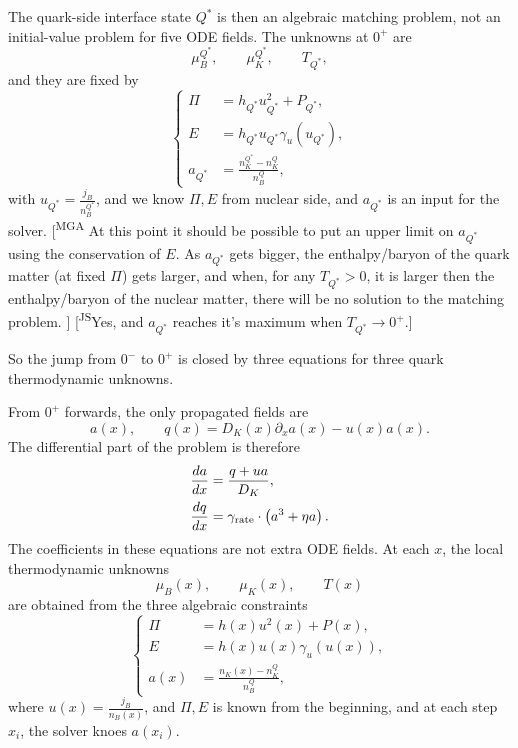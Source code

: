 \documentclass[11pt]{article}
\newcommand{\mgacom}[1]{\textsf{\color[rgb]{0.75,0,0}[\textsuperscript{MGA} #1]}}
\newcommand{\JScom}[1]{\textsf{\color{violet} [\textsuperscript{JS}#1]}}
\begin{document}
{The quark-side interface state \(Q^\ast\) is then an algebraic matching problem,
not an initial-value problem for five ODE fields.  The unknowns at \(0^+\) are
\begin{equation}
\mu_B^{Q^\ast},\qquad \mu_K^{Q^\ast},\qquad T_{Q^\ast},
\end{equation}
and they are fixed by
\begin{equation}
\left\{
\begin{aligned}
\Pi & = h_{Q^\ast}u_{Q^\ast}^2+P_{Q^\ast}, \\
E & = h_{Q^\ast}u_{Q^\ast}\gamma_u(u_{Q^\ast}),\\
a_{Q^\ast} & = \frac{n_K^{Q^\ast}-n_K^Q}{n_B^Q},
\end{aligned}
\right.
\end{equation}
with $u_{Q^\ast}=\frac{j_B}{n_B^{Q^\ast}}$, and we know $\Pi, E$ from nuclear side, and $a_{Q^\ast}$ is an input for the solver.
\mgacom{At this point it should be possible to put an upper limit on $a_{Q^*}$ using the conservation of $E$. As $a_{Q^*}$ gets bigger, the enthalpy/baryon of the quark matter (at fixed $\Pi$) gets larger, and when, for any $T_{Q^*}>0$, it is larger then the enthalpy/baryon of the nuclear matter, there will be no solution to the matching problem. }\JScom{Yes, and $a_{Q^*}$ reaches it's maximum when $T_{Q^*}\to 0^+$.}

So the jump from \(0^-\) to \(0^+\) is closed by three equations for three
quark thermodynamic unknowns.

From $0^+$ forwards, the only propagated fields are
\begin{equation}
a(x),
\qquad
q(x)=D_K(x)\partial_x a(x)-u(x)a(x).
\end{equation}
The differential part of the problem is therefore
\begin{align}
\frac{da}{dx}
&=
\frac{q+u a}{D_K},
\\
\frac{dq}{dx}
&=
\gamma_{\rm rate}\cdot \left(a^3+\eta a\right).
\end{align}
The coefficients in these equations are not extra ODE fields.  At each \(x\),
the local thermodynamic unknowns
\begin{equation}
\mu_B(x),\qquad \mu_K(x),\qquad T(x)
\end{equation}
are obtained from the three algebraic constraints
\begin{equation}
\left\{
\begin{aligned}
\Pi
&=
h(x)u^2(x)+P(x),
\\
E
&=
h(x)u(x)\gamma_u(u(x)),
\\
a(x)
&=
\frac{n_K(x)-n_K^Q}{n_B^Q},
\end{aligned}
\right.
\end{equation}
where $u(x)=\frac{j_B}{n_B(x)}$, and $\Pi, E$ is known from the beginning, and at each step $x_i$, the solver knoes $a(x_i)$.

}
\end{document}
